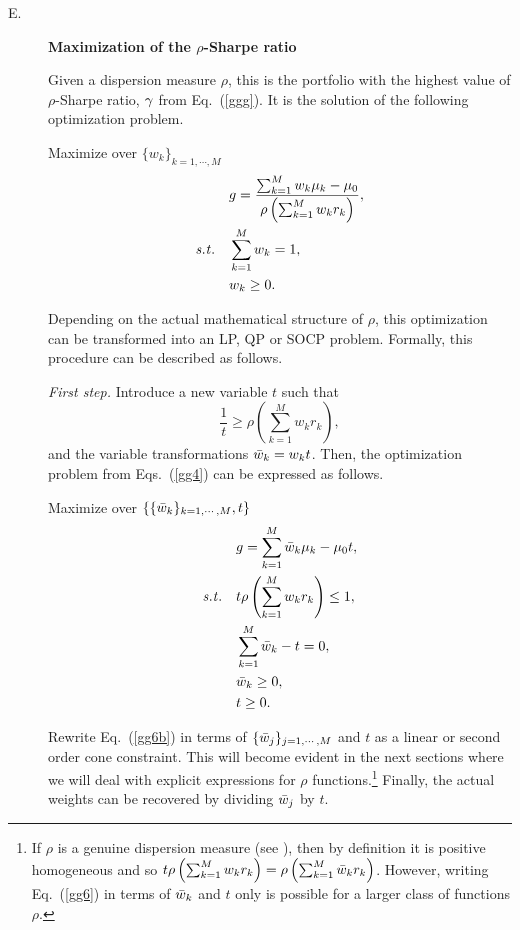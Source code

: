 \begin{description}
  \item[E.\label{MaxSharpe}] {\bf Maximization of the $\rho$-Sharpe ratio}

    Given a dispersion measure $\rho$, this is the portfolio with the highest value of $\rho$-Sharpe ratio,
    ${\gamma}$ from Eq.~(\ref{ggg}).
    It is the solution of the following optimization problem.

    \bigskip
    \noindent Maximize over $\{w_k\}_{k=1,\cdots,M}$
    \begin{subequations}\label{gg4}
    \begin{align}
        & g = \frac{ \sum_{k=1}^M w_k \mu_k - \mu_0}{\rho\left(\sum_{k=1}^M w_k r_k \right)}, \label{gg4a} \\
        \st & \sum_{k=1}^M w_k = 1, \label{gg4b} \\
            & w_k \ge 0. \label{gg4c}
    \end{align}
    \end{subequations}

    \noindent Depending on the actual mathematical structure of $\rho$, this optimization can be transformed into an
    LP, QP or SOCP problem. Formally, this procedure can be described as follows.

    {\it First step.} Introduce a new variable $t$ such that
    \begin{equation}
        \frac{1}{t} \geq \rho\left(\sum_{k=1}^M w_k r_k \right), \label{gg5}
    \end{equation}
    and the variable transformations ${\bar w}_k = w_k t$. Then, the optimization problem from Eqs.~(\ref{gg4}) can be expressed as follows.

    \bigskip
    \noindent Maximize over $\{ \{{\bar w}_k\}_{k=1,\cdots,M}, t\}$
    \begin{subequations}\label{gg6}
    \begin{align}
        & g =  \sum_{k=1}^M \bw_k \mu_k - \mu_0 t, \label{gg6a} \\
        \st & t\rho\left(\sum_{k=1}^M w_k r_k \right) \leq 1, \label{gg6b} \\
            & \sum_{k=1}^M \bw_k - t = 0, \label{gg6c} \\
            & \bw_k \ge 0, \label{gg6d} \\
            & t \ge 0. \label{gg6e}
    \end{align}
    \end{subequations}

     Rewrite Eq.~(\ref{gg6b}) in terms of $\{{\bar w}_j\}_{j=1,\cdots,M}$ and $t$ as a linear or second order cone constraint.
    This will become evident in the next sections where we will deal with explicit expressions for
    $\rho$ functions.\footnote{If $\rho$ is a genuine dispersion measure (see \cite{MM}), then by definition it is positive homogeneous and
    so $t\rho\left(\sum_{k=1}^M w_k r_k \right)=\rho\left(\sum_{k=1}^M {\bar w}_k r_k \right)$. However, writing Eq.~(\ref{gg6}) in terms of
    ${\bar w}_k$ and $t$ only is possible for a larger class of functions $\rho$.}
    Finally, the actual weights can be recovered by dividing ${\bar w}_j$ by $t$.


\end{description}
